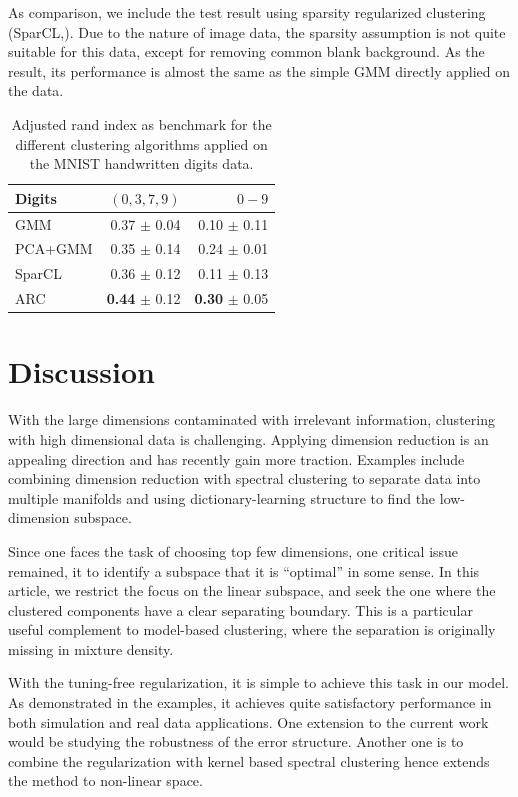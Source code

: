 \documentclass[12pt]{article}
\begin{document}
As comparison, we include the test result using sparsity regularized clustering (SparCL,\cite{witten2012framework}). Due to the nature of image data, the sparsity assumption is not quite suitable for this data, except for removing common blank background. As the result, its performance is almost the same as the simple GMM directly applied on the data.

\begin{table}[H]
\small
\centering
	\begin{tabular}{| l | r | r|}
	\hline
	Digits & $(0,3,7,9)$ & $0-9$ \\
		\hline
			GMM &   0.37 $\pm$ 0.04   &   0.10 $\pm$ 0.11  \\
			PCA+GMM		& 0.35 $\pm$ 0.14  &   0.24 $\pm$ 0.01  \\
			SparCL 	&  0.36 $\pm$ 0.12 & 0.11 $\pm$ 0.13 \\
			ARC 	&  {\bf 0.44} $\pm$ 0.12 &   {\bf 0.30} $\pm$ 0.05  \\
			\hline
		\end{tabular}
	\label{tabs2}
		\caption{Adjusted rand index as benchmark for the different clustering algorithms applied on the MNIST handwritten digits data.}
\end{table}


\section{Discussion}

With the large dimensions contaminated with irrelevant information, clustering with high dimensional data is challenging. Applying dimension reduction is an appealing direction and has recently gain more traction. Examples include \cite{niu2011dimensionality} combining dimension reduction with spectral clustering to separate data into multiple manifolds and \cite{jing2013dictionary} using dictionary-learning structure to find the low-dimension subspace.

Since one faces the task of choosing top few dimensions, one critical issue remained, it to identify a subspace that it is ``optimal'' in some sense. In this article, we restrict the focus on the linear subspace, and seek the one where the clustered components have a clear separating boundary. This is a particular useful complement to model-based clustering, where the separation is originally missing in mixture density.

With the tuning-free regularization, it is simple to achieve this task in our model. As demonstrated in the examples, it achieves quite satisfactory performance in both simulation and real data applications. One extension to the current work would be studying the robustness of the error structure. Another one is to combine the regularization with kernel based spectral clustering hence extends the method to non-linear space.
\end{document}

